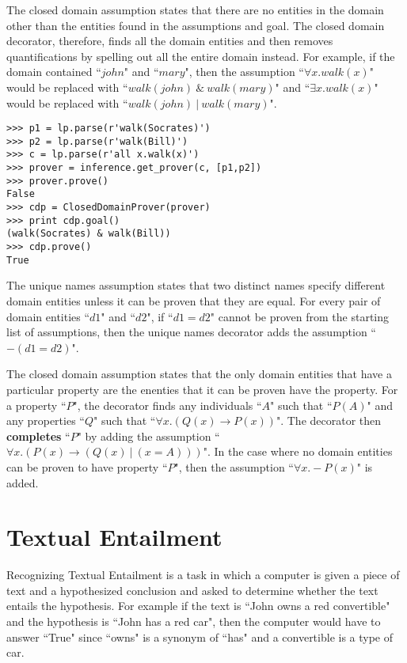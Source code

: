 \documentclass{article}
\begin{document}
The closed domain assumption states that there are no entities in the domain other than the entities found in the assumptions and goal.  The closed domain decorator, therefore, finds all the domain entities and then removes quantifications by spelling out all the entire domain instead.  For example, if the domain contained ``$john$" and ``$mary$", then the assumption ``$\forall x.walk(x)$" would be replaced with ``$walk(john)~\&~walk(mary)$" and ``$\exists x.walk(x)$" would be replaced with ``$walk(john)~|~walk(mary)$".

\begin{verbatim}
>>> p1 = lp.parse(r'walk(Socrates)')
>>> p2 = lp.parse(r'walk(Bill)')
>>> c = lp.parse(r'all x.walk(x)')
>>> prover = inference.get_prover(c, [p1,p2])
>>> prover.prove()
False
>>> cdp = ClosedDomainProver(prover)
>>> print cdp.goal()
(walk(Socrates) & walk(Bill))
>>> cdp.prove()
True
\end{verbatim}

The unique names assumption states that two distinct names specify different domain entities unless it can be proven that they are equal.  For every pair of domain entities ``$d1$" and ``$d2$", if ``$d1 = d2$" cannot be proven from the starting list of assumptions, then the unique names decorator adds the assumption ``$-(d1 = d2)$".

The closed domain assumption states that the only domain entities that have a particular property are the enenties that it can be proven have the property.  For a property ``$P$", the decorator finds any individuals ``$A$" such that ``$P(A)$" and any properties ``$Q$" such that ``$\forall x.(Q(x) \rightarrow P(x))$".  The decorator then \textbf{completes} ``$P$" by adding the assumption ``$\forall x.(P(x) \rightarrow (Q(x)~|~(x = A)))$".  In the case where no domain entities can be proven to have property ``$P$", then the assumption ``$\forall x.-P(x)$" is added.


\section{Textual Entailment}
Recognizing Textual Entailment is a task in which a computer is given a piece of text and a hypothesized conclusion and asked to determine whether the text entails the hypothesis.  For example if the text is ``John owns a red convertible" and the hypothesis is ``John has a red car", then the computer would have to answer ``True" since ``owns" is a synonym of ``has" and a convertible is a type of car.  
\end{document}
